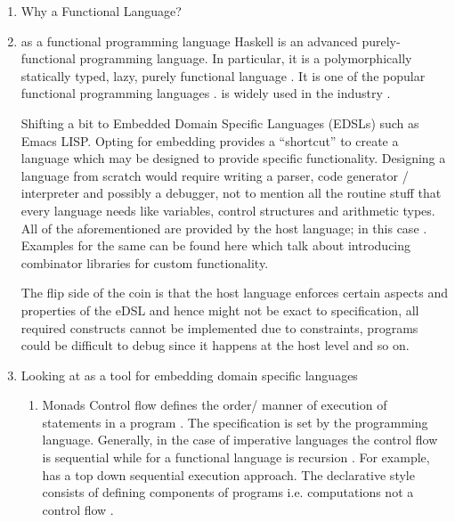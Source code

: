 \documentclass[thesis-solanki.tex]{subfiles}
\begin{document}
\begin{enumerate}

\item Why a Functional Language?

\item
   as a functional programming language Haskell is an advanced purely-functional programming
  language.
  In particular, it is a polymorphically statically typed, lazy, purely functional language
  \cite{website:haskellwiki}.
  It is one of the popular functional programming languages \cite{website:langpop}.
   is widely used in the industry \cite{website:haskellinindustry}.

  Shifting a bit to Embedded Domain Specific Languages (EDSLs) such as Emacs LISP.
  Opting for embedding provides a ``shortcut'' to create a language which may be designed to provide specific
  functionality.
  Designing a language from scratch would require writing a parser, code generator / interpreter and possibly a
  debugger, not to mention all the routine stuff that every language
  needs like variables, control structures and 
  arithmetic types.
  All of the aforementioned are provided by the host language; in this case .
  Examples for the same can be found here \cite{jones2001composing, meyer2008eiffel} which talk about introducing
  combinator libraries for custom functionality.

  The flip side of the coin is that the host language enforces certain aspects and properties of the eDSL and hence
  might not be exact to specification, all required constructs cannot be implemented due to constraints, programs
  could be difficult to debug since it happens at the host level and so on.

\item Looking at  as a tool for embedding domain specific languages \cite{website:paulspontifications}

\begin{enumerate}
\item Monads
\newline
Control flow defines the order/ manner of execution of statements in a pro\-gram \cite{website:controlflowwiki}.
The specification is set by the programming language.
Generally, in the case of imperative languages the control flow is sequential while for a functional language is
recursion \cite{website:controlflowdalhousie}.
For example,  has a top down sequential execution approach.
The declarative style consists of defining components of programs i.e.
computations not a control flow \cite{website:declarativeprogrammingwiki}.


\end{enumerate}
\end{enumerate}
\end{document}
